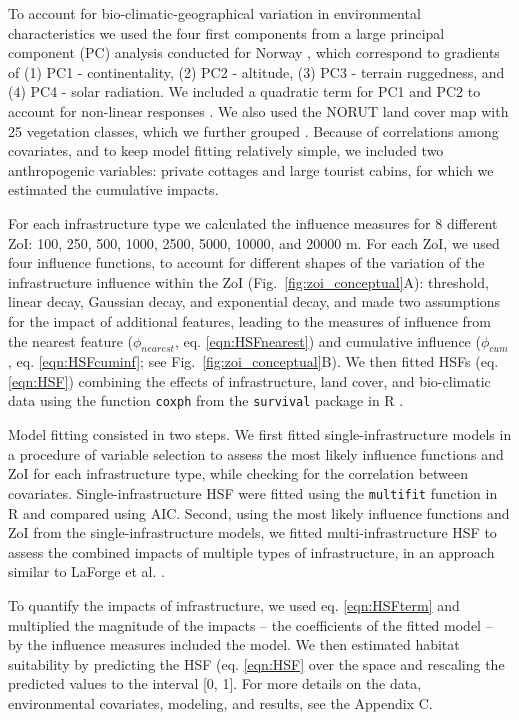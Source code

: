 \documentclass[titlepage]{article}
\begin{document}
To account for bio-climatic-geographical variation in environmental characteristics we used the four first components from a large principal component (PC) analysis conducted for Norway \citep{bakkestuen_step-less_2008}, which correspond to gradients of (1) PC1 - continentality, (2) PC2 - altitude, (3) PC3 - terrain ruggedness, and (4) PC4 - solar radiation. We included a quadratic term for PC1 and PC2 to account for non-linear responses \citep{panzacchi_searching_2015}. We also used the NORUT land cover map with 25 vegetation classes, which we further grouped \citep[see Table C2][]{johansen_vegetasjonskart_2009}. Because of correlations among covariates, and to keep model fitting relatively simple, we included two anthropogenic variables: private cottages and large tourist cabins, for which we estimated the cumulative impacts.

For each infrastructure type we calculated the influence measures for 8 different ZoI: 100, 250, 500, 1000, 2500, 5000, 10000, and 20000 m. For each ZoI, we used four influence functions, to account for different shapes of the variation of the infrastructure influence within the ZoI (Fig.~\ref{fig:zoi_conceptual}A): threshold, linear decay, Gaussian decay, and exponential decay, and made two assumptions for the impact of additional features, leading to the measures of influence from the nearest feature ($\phi_{nearest}$, eq. \ref{eqn:HSFnearest}) and cumulative influence ($\phi_{cum}$, eq. \ref{eqn:HSFcuminf}; see Fig.~\ref{fig:zoi_conceptual}B). We then fitted HSFs (eq. \ref{eqn:HSF}) combining the effects of infrastructure, land cover, and bio-climatic data using the function \verb|coxph| from the \verb|survival| package in R \citep{therneau_package_2020, therneau_modeling_2000}. 

Model fitting consisted in two steps. We first fitted single-infrastructure models in a procedure of variable selection \citep{burnham_model_2002} to assess the most likely influence functions and ZoI for each infrastructure type, while checking for the correlation between covariates. Single-infrastructure HSF were fitted using the \verb|multifit| function in R \citep{huais_multifit_2018} and compared using AIC. Second, using the most likely influence functions and ZoI from the single-infrastructure models, we fitted multi-infrastructure HSF to assess the combined impacts of multiple types of infrastructure, in an approach similar to LaForge et al. \citealt{laforge_process-focussed_2015}. 

To quantify the impacts of infrastructure, we used eq. \ref{eqn:HSFterm} and multiplied the magnitude of the impacts -- the coefficients of the fitted model -- by the influence measures included the model. We then estimated habitat suitability by predicting the HSF (eq. \ref{eqn:HSF} over the space and rescaling the predicted values to the interval [0, 1]. For more details on the data, environmental covariates, modeling, and results, see the Appendix C.
\end{document}
